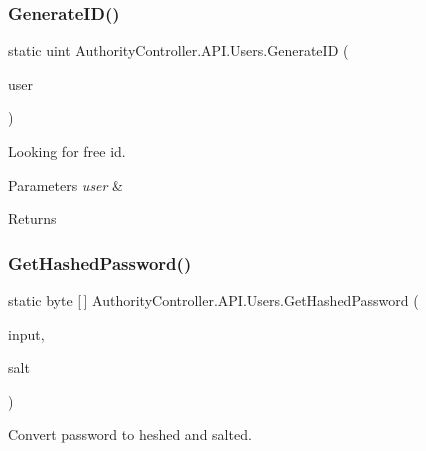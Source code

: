 \subsubsection{\texorpdfstring{Generate\+I\+D()}{GenerateID()}}
{\footnotesize\ttfamily static uint Authority\+Controller.\+A\+P\+I.\+Users.\+Generate\+ID (\begin{DoxyParamCaption}\item[{\mbox{\hyperlink{class_authority_controller_1_1_data_1_1_user}{User}}}]{user }\end{DoxyParamCaption})\hspace{0.3cm}{\ttfamily [static]}}



Looking for free id. 


\begin{DoxyParams}{Parameters}
{\em user} & \\
\hline
\end{DoxyParams}
\begin{DoxyReturn}{Returns}

\end{DoxyReturn}
\mbox{\label{class_authority_controller_1_1_a_p_i_1_1_users_a9a1f211c403459ac15b312504444f0c2}} 
\subsubsection{\texorpdfstring{Get\+Hashed\+Password()}{GetHashedPassword()}}
{\footnotesize\ttfamily static byte \mbox{[}$\,$\mbox{]} Authority\+Controller.\+A\+P\+I.\+Users.\+Get\+Hashed\+Password (\begin{DoxyParamCaption}\item[{string}]{input,  }\item[{\mbox{\hyperlink{class_authority_controller_1_1_data_1_1_salt_container}{Data.\+Salt\+Container}}}]{salt }\end{DoxyParamCaption})\hspace{0.3cm}{\ttfamily [static]}}



Convert password to heshed and salted. 


